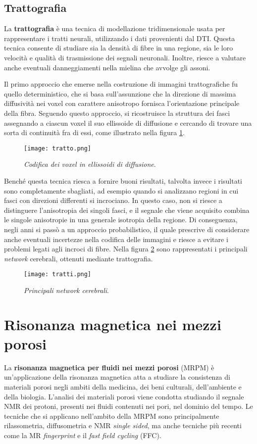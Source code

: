 \documentclass{report}
\newcommand{\figref}[1]{figura \ref{#1}}
\numberwithin{equation}{section}
\numberwithin{figure}{section}
\begin{document}
\subsection{Trattografia}
La \textbf{trattografia} è una tecnica di modellazione tridimensionale usata per rappresentare i tratti neurali, utilizzando i dati provenienti dal DTI. Questa tecnica consente di studiare sia la densità di fibre in una regione, sia le loro velocità e qualità di trasmissione dei segnali neuronali. Inoltre, riesce a valutare anche eventuali danneggiamenti nella mielina che avvolge gli assoni.

Il primo approccio che emerse nella costruzione di immagini trattografiche fu quello deterministico, che si basa sull'assunzione che la direzione di massima diffusività nei voxel con carattere anisotropo fornisca l'orientazione principale della fibra. Seguendo questo approccio, si ricostruisce la struttura dei fasci assegnando a ciascun voxel il suo ellissoide di diffusione e cercando di trovare una sorta di continuità fra di essi, come illustrato nella \figref{fig:tratto}.

\begin{figure}[htp]
\centering
\texttt{[image: tratto.png]}
\caption{\label{fig:tratto} \textit{Codifica dei voxel in ellissoidi di diffusione}.}
\end{figure}

Benché questa tecnica riesca a fornire buoni risultati, talvolta invece i risultati sono completamente sbagliati, ad esempio quando si analizzano regioni in cui fasci con direzioni differenti si incrociano. In questo caso, non si riesce a distinguere l'anisotropia dei singoli fasci, e il segnale che viene acquisito combina le singole anisotropie in una generale isotropia della regione. Di conseguenza, negli anni si passò a un approccio probabilistico, il quale prescrive di considerare anche eventuali incertezze nella codifica delle immagini e riesce a evitare i problemi legati agli incroci di fibre. Nella \figref{fig:tratti} sono rappresentati i principali \textit{network} cerebrali, ottenuti mediante trattografia.

\begin{figure}[htp]
\centering
\texttt{[image: tratti.png]}
\caption{\label{fig:tratti} \textit{Principali network cerebrali}.}
\end{figure}

\section{Risonanza magnetica nei mezzi porosi}
La \textbf{risonanza magnetica per fluidi nei mezzi porosi} (MRPM) è un'applicazione della risonanza magnetica atta a studiare la consistenza di materiali porosi negli ambiti della medicina, dei beni culturali, dell'ambiente e della biologia. L'analisi dei materiali porosi viene condotta studiando il segnale NMR dei protoni, presenti nei fluidi contenuti nei pori, nel dominio del tempo. Le tecniche che si applicano nell'ambito della MRPM sono principalmente rilassometria, diffusometria e NMR \textit{single sided}, ma anche tecniche più recenti come la MR \textit{fingerprint} e il \textit{fast field cycling} (FFC).
\end{document}
